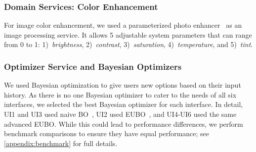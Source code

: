 \documentclass[acmsmall,screen,nonacm]{acmart}
\begin{document}
\subsubsection{Domain Services: Color Enhancement} 
For image color enhancement, we used a parameterized photo enhancer~\cite{koyama2016selph, koyama2017sequential, koyama2020sequential} as an image processing service. It allows 5 adjustable system parameters that can range from 0 to 1:
1)~\emph{brightness},
2)~\emph{contrast},
3)~\emph{saturation},
4)~\emph{temperature}, and
5)~\emph{tint}.

\subsubsection{Optimizer Service and Bayesian Optimizers}
\label{sec:bo-service}
We used Bayesian optimization to give users new options based on their input history. As there is no one Bayesian optimizer to cater to the needs of all six interfaces, we selected the best Bayesian optimizer for each interface. In detail, UI1 and UI3 used naive BO~\cite{mockus1978application}, UI2 used EUBO~\cite{lin2022preference}, and UI4-UI6 used the same advanced EUBO. While this could lead to performance differences, we perform benchmark comparisons to ensure they have equal performance; see \autoref{appendix:benchmark} for full details.
\end{document}
